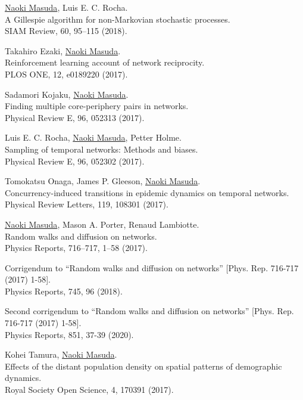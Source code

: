 \documentclass[11pt,letter]{article}
\renewenvironment{itemize}{
  \begin{list}{}{
    \setlength{\leftmargin}{1.5em}
    \setlength{\itemsep}{0.25em}
    \setlength{\parskip}{0pt}
    \setlength{\parsep}{0.25em}
  }
}{
  \end{list}
}
\begin{document}
\begin{etaremune}
\item \underline{Naoki Masuda}, Luis E. C. Rocha.\\
A Gillespie algorithm for non-Markovian stochastic processes.\\
SIAM Review, 60, 95--115 (2018).

\item Takahiro Ezaki, \underline{Naoki Masuda}.\\
Reinforcement learning account of network reciprocity.\\
PLOS ONE, 12, e0189220 (2017).

\item Sadamori Kojaku, \underline{Naoki Masuda}.\\
Finding multiple core-periphery pairs in networks.\\
Physical Review E, 96, 052313 (2017).

\item Luis E. C. Rocha, \underline{Naoki Masuda}, Petter Holme.\\
Sampling of temporal networks: Methods and biases.\\
Physical Review E, 96, 052302 (2017).

\item Tomokatsu Onaga, James P. Gleeson, \underline{Naoki Masuda}.\\
Concurrency-induced transitions in epidemic dynamics on temporal networks.\\
Physical Review Letters, 119, 108301 (2017).

\item \underline{Naoki Masuda}, Mason A. Porter, Renaud Lambiotte.\\
Random walks and diffusion on networks.\\
Physics Reports, 716--717, 1--58 (2017).
    \begin{itemize}
    \item Corrigendum to ``Random walks and diffusion on networks'' [Phys. Rep. 716-717 (2017) 1-58].\\
        Physics Reports, 745, 96 (2018).
    \item Second corrigendum to ``Random walks and diffusion on networks'' [Phys. Rep. 716-717 (2017) 1-58].\\
        Physics Reports, 851, 37-39 (2020).
    \end{itemize}

\item Kohei Tamura, \underline{Naoki Masuda}.\\
Effects of the distant population density on spatial patterns of demographic dynamics.\\
Royal Society Open Science, 4, 170391 (2017).


\end{etaremune}
\end{document}
